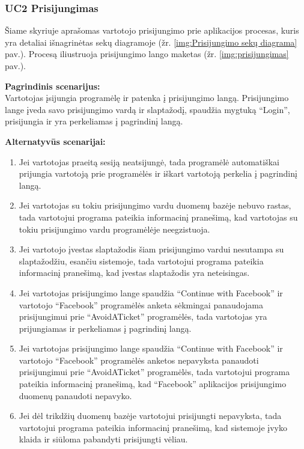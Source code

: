 \documentclass{VUMIFPSkursinis}
\begin{document}
\subsubsection{UC2 Prisijungimas}
	Šiame skyriuje aprašomas vartotojo prisijungimo prie aplikacijos procesas,  kuris yra detaliai išnagrinėtas sekų diagramoje (žr. \ref{img:Prisijungimo sekų diagrama} pav.). 
	Procesą iliustruoja prisijungimo lango maketas (žr. \ref{img:prisijungimas} pav.).

	\textbf{Pagrindinis scenarijus:}\\
	Vartotojas įsijungia programėlę ir patenka į prisijungimo langą. Prisijungimo lange įveda savo prisijungimo vardą ir slaptažodį, 
	spaudžia mygtuką “Login”, prisijungia ir yra perkeliamas į pagrindinį langą.
	
	\textbf{Alternatyvūs scenarijai:}
	\begin{enumerate}[itemsep=-2mm]
		\item Jei vartotojas praeitą sesiją neatsijungė, tada programėlė automatiškai prijungia vartotoją prie programėlės ir iškart vartotoją perkelia į pagrindinį langą.
		\item Jei vartotojas su tokiu prisijungimo vardu duomenų bazėje nebuvo rastas, tada vartotojui programa pateikia informacinį pranešimą, kad vartotojas su tokiu prisijungimo vardu programėlėje neegzistuoja.
		\item Jei vartotojo įvestas slaptažodis šiam prisijungimo vardui nesutampa su slaptažodžiu, esančiu sistemoje, tada vartotojui programa pateikia informacinį pranešimą, kad įvestas slaptažodis yra neteisingas.
		\item Jei vartotojas prisijungimo lange spaudžia “Continue with Facebook” ir vartotojo “Facebook” programėlės anketa sėkmingai panaudojama prisijungimui prie “AvoidATicket” programėlės, tada vartotojas yra prijungiamas ir perkeliamas į pagrindinį langą.
		\item Jei vartotojas prisijungimo lange spaudžia “Continue with Facebook” ir vartotojo “Facebook” programėlės anketos nepavyksta panaudoti prisijungimui prie “AvoidATicket” programėlės, tada vartotojui programa pateikia informacinį pranešimą, kad “Facebook” aplikacijos prisijungimo duomenų panaudoti nepavyko.
		\item Jei dėl trikdžių duomenų bazėje vartotojui prisijungti nepavyksta, tada vartotojui programa pateikia informacinį pranešimą, kad sistemoje įvyko klaida ir siūloma pabandyti prisijungti vėliau.
	\end{enumerate} 
\end{document}
